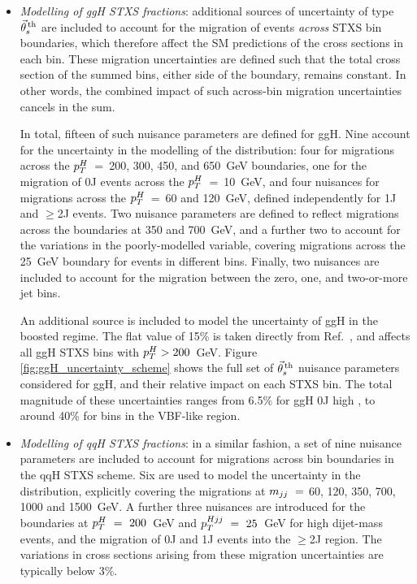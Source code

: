 \begin{itemize}
    \item \textit{Modelling of ggH STXS fractions}: additional sources of uncertainty of type $\vec{\theta}^{\,\rm{th}}_{s}$ are included to account for the migration of events \textit{across} STXS bin boundaries, which therefore affect the SM predictions of the cross sections in each bin. These migration uncertainties are defined such that the total cross section of the summed bins, either side of the boundary, remains constant. In other words, the combined impact of such across-bin migration uncertainties cancels in the sum.
    
    \noindent
    In total, fifteen of such nuisance parameters are defined for ggH. Nine account for the uncertainty in the modelling of the \ptH distribution: four for migrations across the $p_T^H$~=~200, 300, 450, and 650~GeV boundaries, one for the migration of 0J events across the $p_T^H$~=~10~GeV, and four nuisances for migrations across the $p_T^H$~=~60 and 120~GeV, defined independently for 1J and $\geq$2J events. Two nuisance parameters are defined to reflect migrations across the \mjj boundaries at 350 and 700~GeV, and a further two to account for the variations in the poorly-modelled \ptHjj variable, covering migrations across the 25~GeV boundary for events in different \mjj bins. Finally, two nuisances are included to account for the migration between the zero, one, and two-or-more jet bins. 
    
    \noindent
    An additional source is included to model the uncertainty of ggH in the boosted regime. The flat value of 15\% is taken directly from Ref.~\cite{Becker:2020rjp}, and affects all ggH STXS bins with $p_T^H>200$~GeV. Figure \ref{fig:ggH_uncertainty_scheme} shows the full set of $\vec{\theta}^{\,\rm{th}}_{s}$ nuisance parameters considered for ggH, and their relative impact on each STXS bin. The total magnitude of these uncertainties ranges from 6.5\% for ggH 0J high \ptH, to around 40\% for bins in the VBF-like region.
    
    \item \textit{Modelling of qqH STXS fractions}: in a similar fashion, a set of nine nuisance parameters are included to account for migrations across bin boundaries in the qqH STXS scheme. Six are used to model the uncertainty in the \mjj distribution, explicitly covering the migrations at $m_{jj}~=~$60, 120, 350, 700, 1000 and 1500~GeV. A further three nuisances are introduced for the boundaries at $p_T^H~=~200$~GeV and $p_T^{Hjj}~=~25$~GeV for high dijet-mass events, and the migration of 0J and 1J events into the $\geq$2J region. The variations in cross sections arising from these migration uncertainties are typically below 3\%.
    

\end{itemize}
